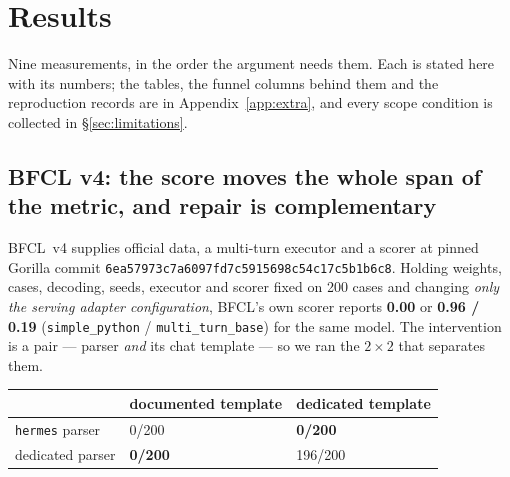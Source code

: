 \section{Results}
\label{sec:results}

Nine measurements, in the order the argument needs them. Each is stated here with its numbers;
the tables, the funnel columns behind them and the reproduction records are in
Appendix~\ref{app:extra}, and every scope condition is collected in \S\ref{sec:limitations}.

\subsection{BFCL v4: the score moves the whole span of the metric, and repair is complementary}
\label{sec:bfcl}

BFCL~v4 supplies official data, a multi-turn executor and a scorer at pinned Gorilla commit
\texttt{6ea57973c7a6097fd7c5915698c54c17c5b1b6c8}. Holding weights, cases, decoding, seeds,
executor and scorer fixed on 200 cases and changing \emph{only the serving adapter
configuration}, BFCL's own scorer reports \textbf{0.00} or \textbf{0.96 / 0.19}
(\texttt{simple\_python} / \texttt{multi\_turn\_base}) for the same model. The intervention is a
pair --- parser \emph{and} its chat template --- so we ran the $2\times2$ that separates them.

\begin{center}
\small
{}\label{tab:bfcl2x2}
\begin{tabular}{@{}lll@{}}
\toprule
& documented template & dedicated template \\
\midrule
\texttt{hermes} parser & 0/200 & \textbf{0/200} \\
dedicated parser & \textbf{0/200} & 196/200 \\
\bottomrule
\end{tabular}
\end{center}

